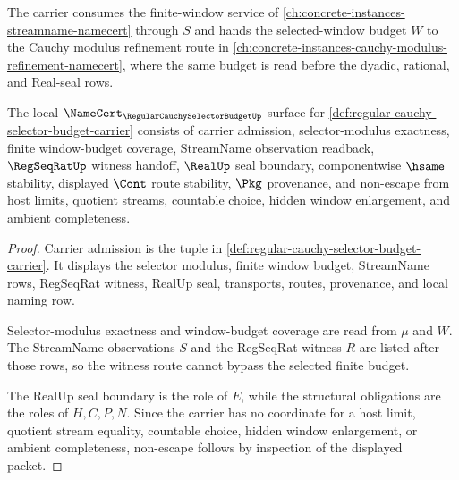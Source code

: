 The carrier consumes the finite-window service of \autoref{ch:concrete-instances-streamname-namecert} through $S$ and hands the selected-window budget $W$ to the Cauchy modulus refinement route in \autoref{ch:concrete-instances-cauchy-modulus-refinement-namecert}, where the same budget is read before the dyadic, rational, and Real-seal rows.

\begin{theorem}
\label{thm:regular-cauchy-selector-budget-namecert-obligations}
The local $\NameCert_{\RegularCauchySelectorBudgetUp}$ surface for \autoref{def:regular-cauchy-selector-budget-carrier} consists of carrier admission, selector-modulus exactness, finite window-budget coverage, StreamName observation readback, $\RegSeqRatUp$ witness handoff, $\RealUp$ seal boundary, componentwise $\hsame$ stability, displayed $\Cont$ route stability, $\Pkg$ provenance, and non-escape from host limits, quotient streams, countable choice, hidden window enlargement, and ambient completeness.
\end{theorem}
\begin{proof}
Carrier admission is the tuple in \autoref{def:regular-cauchy-selector-budget-carrier}. It displays the selector modulus, finite window budget, StreamName rows, RegSeqRat witness, RealUp seal, transports, routes, provenance, and local naming row.

Selector-modulus exactness and window-budget coverage are read from $\mu$ and $W$. The StreamName observations $S$ and the RegSeqRat witness $R$ are listed after those rows, so the witness route cannot bypass the selected finite budget.

The RealUp seal boundary is the role of $E$, while the structural obligations are the roles of $H,C,P,N$. Since the carrier has no coordinate for a host limit, quotient stream equality, countable choice, hidden window enlargement, or ambient completeness, non-escape follows by inspection of the displayed packet.
\end{proof}

